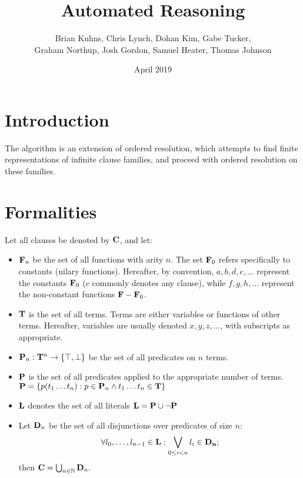 \documentclass{article}
\title{Automated Reasoning}
\author{
	Brian Kuhns,
	Chris Lynch,
	Dohan Kim,
	Gabe Tucker, \\
	Graham Northup,
	Josh Gordon,
	Samuel Heater,
	Thomas Johnson
  }
\date{April 2019}
\newcommand{\allclauses}[0]{{\bf C}}
\newcommand{\allvars}[0]{{\bf V}}
\newcommand{\allpreds}[0]{{\bf P}}
\newcommand{\allliterals}[0]{{\bf L}}
\newcommand{\allterms}[0]{{\bf T}}
\newcommand{\allfuncs}[0]{{\bf F}}
\newcommand{\constfuncs}[0]{\allfuncs_0}
\newcommand{\true}[0]{\top}
\newcommand{\false}[0]{\bot}
\newcommand{\nat}[0]{{\mathbb N}}
\begin{document}
\maketitle

\section{Introduction}


The algorithm is an extension of ordered resolution,
which attempts to find finite representations of infinite clause families,
and proceed with ordered resolution on these families.

\section{Formalities}

Let all clauses be denoted by $\allclauses$, and let:
\begin{itemize}
	\item $\allfuncs_n$ be the set of all functions with arity $n$.  The set $\constfuncs$ refers specifically to constants (nilary functions). Hereafter, by convention, $a, b, d, e, \ldots$ represent the constants $\constfuncs$ ($c$ commonly denotes any clause), while $f, g, h, \ldots$ represent the non-constant functions $\allfuncs - \constfuncs$.
	\item $\allterms$ is the set of all terms. Terms are either variables or functions of other terms. Hereafter, variables are usually denoted $x, y, z, \ldots$, with subscripts as appropriate.
	\item $\allpreds_n : \allterms^n \rightarrow \{\true,\false\}$ be the set of all predicates on $n$ terms. %
  \item $\allpreds$ is the set of all predicates applied to the appropriate number of terms. $\allpreds = \{ p(t_1 \ldots t_n) : p \in \allpreds_n \land t_1 \ldots t_n \in \allterms \}$
  \item $\allliterals$ denotes the set of all literals $\allliterals = \allpreds \cup \neg \allpreds$
	\item Let ${\bf D}_n$ be the set of all disjunctions over predicates of size $n$:
		$$
    \forall l_0,\ldots,l_{n-1} \in \allliterals: \bigvee_{0 \leq i < n} l_i \in \bf D_n;
		$$
		then $\allclauses = \bigcup_{n \in \nat} {\bf D}_n.$
\end{itemize}
\end{document}
